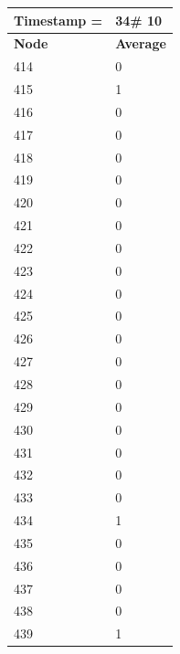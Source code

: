 \begin{tabular}{|l||l|}
\hline
\textbf{Timestamp =} & \textbf{34}\# 10\\\hline
	\textbf{Node} & \textbf{Average} \\ \hline
\hline
	414 & 0 \\ \hline
	415 & 1 \\ \hline
	416 & 0 \\ \hline
	417 & 0 \\ \hline
	418 & 0 \\ \hline
	419 & 0 \\ \hline
	420 & 0 \\ \hline
	421 & 0 \\ \hline
	422 & 0 \\ \hline
	423 & 0 \\ \hline
	424 & 0 \\ \hline
	425 & 0 \\ \hline
	426 & 0 \\ \hline
	427 & 0 \\ \hline
	428 & 0 \\ \hline
	429 & 0 \\ \hline
	430 & 0 \\ \hline
	431 & 0 \\ \hline
	432 & 0 \\ \hline
	433 & 0 \\ \hline
	434 & 1 \\ \hline
	435 & 0 \\ \hline
	436 & 0 \\ \hline
	437 & 0 \\ \hline
	438 & 0 \\ \hline
	439 & 1 \\ \hline
\end{tabular}

